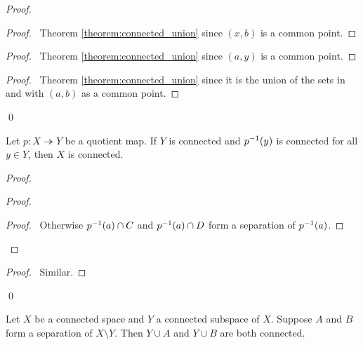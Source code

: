 \begin{proof}
    \pf
    \begin{proof}
        \pf\ Theorem \ref{theorem:connected_union} since $(x,b)$ is a common point.
    \end{proof}
    \begin{proof}
        \pf\ Theorem \ref{theorem:connected_union} since $(a,y)$ is a common point.
    \end{proof}
    \begin{proof}
        \pf\ Theorem \ref{theorem:connected_union} since it is the union of the sets in  and  with $(a,b)$ as a common point.
    \end{proof}
    \qed
\end{proof}

\begin{proposition}
    Let $p : X \twoheadrightarrow Y$ be a quotient map. If $Y$ is connected and ${p}^{-1}(y)$ is connected for all $y \in Y$, then $X$ is connected.
\end{proposition}

\begin{proof}
    \pf
    \begin{proof}
        \begin{proof}
            \pf\ Otherwise ${p}^{-1}(a) \cap C$ and ${p}^{-1}(a) \cap D$ form a separation of ${p}^{-1}(a)$.
        \end{proof}
    \end{proof}
    \begin{proof}
        \pf\ Similar.
    \end{proof}
    \qed
\end{proof}

\begin{proposition}
    Let $X$ be a connected space and $Y$ a connected subspace of $X$. Suppose $A$ and $B$ form a separation of $X \setminus Y$. Then $Y \cup A$ and $Y \cup B$ are both connected.
\end{proposition}

